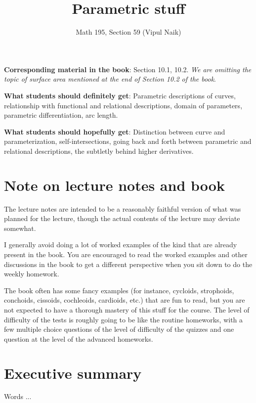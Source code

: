 \documentclass[10pt]{amsart}
\title{Parametric stuff}
\author{Math 195, Section 59 (Vipul Naik)}
\begin{document}
\maketitle

{\bf Corresponding material in the book}: Section 10.1, 10.2. {\em We
are omitting the topic of surface area mentioned at the end of Section
10.2 of the book}.

{\bf What students should definitely get}: Parametric descriptions of
curves, relationship with functional and relational descriptions,
domain of parameters, parametric differentiation, arc length.

{\bf What students should hopefully get}: Distinction between curve
and parameterization, self-intersections, going back and forth between
parametric and relational descriptions, the subtletly behind higher
derivatives.

\section*{Note on lecture notes and book}

The lecture notes are intended to be a reasonably faithful version of
what was planned for the lecture, though the actual contents of the
lecture may deviate somewhat.

I generally avoid doing a lot of worked examples of the kind that are
already present in the book. You are encouraged to read the worked
examples and other discussions in the book to get a different
perspective when you sit down to do the weekly homework.

The book often has some fancy examples (for instance, cycloids,
strophoids, conchoids, cissoids, cochleoids, cardioids, etc.)  that
are fun to read, but you are not expected to have a thorough mastery
of this stuff for the course. The level of difficulty of the tests is
roughly going to be like the routine homeworks, with a few multiple
choice questions of the level of difficulty of the quizzes and one
question at the level of the advanced homeworks.

\section*{Executive summary}

Words ...
\end{document}
